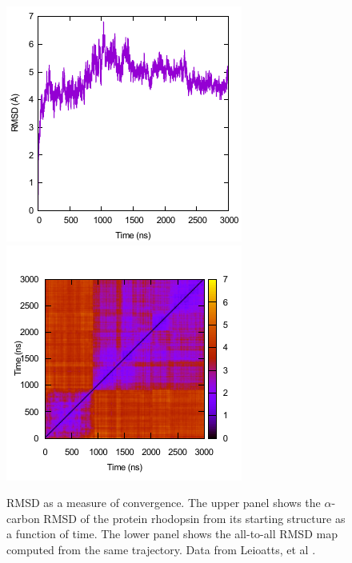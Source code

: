 \begin{figure}
  \centering
  \includegraphics[width=0.9\linewidth]{figures/rmsd}
  \includegraphics[width=0.9\linewidth]{figures/rmsds}
  \caption{RMSD as a measure of convergence.  The upper panel shows the
    $\alpha$-carbon RMSD of the protein rhodopsin from its starting structure as a
    function of time.  The lower panel shows the all-to-all RMSD map computed from the same
    trajectory.  Data from Leioatts, et al \cite{Grossfield-2015}.}
  \label{f:rmsd}
\end{figure}

